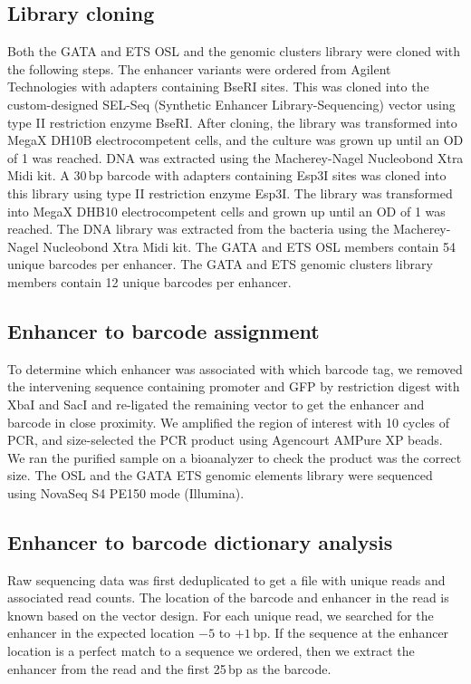 \subsection{Library cloning}
Both the GATA and ETS OSL and the genomic clusters library were cloned with the following steps. The enhancer variants were ordered from Agilent Technologies with adapters containing BseRI sites. This was cloned into the custom-designed SEL-Seq (Synthetic Enhancer Library-Sequencing) vector using type II restriction enzyme BseRI\cite{Farley2016-eh}. After cloning, the library was transformed into MegaX DH10B electrocompetent cells, and the culture was grown up until an OD of 1 was reached. DNA was extracted using the Macherey-Nagel Nucleobond Xtra Midi kit. A 30\,bp barcode with adapters containing Esp3I sites was cloned into this library using type II restriction enzyme Esp3I. The library was transformed into MegaX DHB10 electrocompetent cells and grown up until an OD of 1 was reached. The DNA library was extracted from the bacteria using the Macherey-Nagel Nucleobond Xtra Midi kit. The GATA and ETS OSL members contain 54 unique barcodes per enhancer. The GATA and ETS genomic clusters library members contain 12 unique barcodes per enhancer.

\subsection{Enhancer to barcode assignment}
To determine which enhancer was associated with which barcode tag, we removed the intervening sequence containing promoter and GFP by restriction digest with XbaI and SacI and re-ligated the remaining vector to get the enhancer and barcode in close proximity. We amplified the region of interest with 10 cycles of PCR, and size-selected the PCR product using Agencourt AMPure XP beads. We ran the purified sample on a bioanalyzer to check the product was the correct size. The OSL and the GATA ETS genomic elements library were sequenced using NovaSeq S4 PE150 mode (Illumina).

\subsection{Enhancer to barcode dictionary analysis}
Raw sequencing data was first deduplicated to get a file with unique reads and associated read counts. The location of the barcode and enhancer in the read is known based on the vector design. For each unique read, we searched for the enhancer in the expected location $-5$ to $+1$\,bp. If the sequence at the enhancer location is a perfect match to a sequence we ordered, then we extract the enhancer from the read and the first 25\,bp as the barcode.


